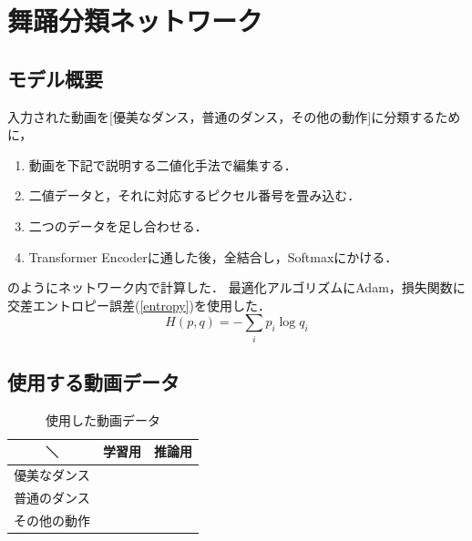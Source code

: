 \section{舞踊分類ネットワーク}

\subsection{モデル概要}
入力された動画を[優美なダンス，普通のダンス，その他の動作]に分類するために，
\begin{enumerate}
  \item 動画を下記で説明する二値化手法で編集する．
  \item 二値データと，それに対応するピクセル番号を畳み込む．
  \item 二つのデータを足し合わせる．
  \item Transformer Encoderに通した後，全結合し，Softmaxにかける．
\end{enumerate}
のようにネットワーク内で計算した．
最適化アルゴリズムにAdam\cite{adam}，損失関数に交差エントロピー誤差(\ref{entropy})を使用した．
\begin{equation}
  H(p, q) = -\sum_{i}p_i\log q_i
  \label{entropy}
\end{equation}

\subsection{使用する動画データ}
\begin{table}[b]
  \begin{center}
    \begin{tabular}{|c|c|c|} \hline
      ＼ & 学習用 & 推論用 \\ \hline
      優美なダンス
        & \cite{jpn}\cite{china}\cite{ballet}\cite{thai}\cite{jpn2}
        & \cite{balletgroup}\cite{jpngroup}\cite{chinagroup}\cite{belly}
      \\ \hline
      普通のダンス
        & \cite{ariana}\cite{kadokawa}\cite{bts}\cite{manolo}\cite{aito}
        & \cite{btsgroup}\cite{arashi}\cite{hyoga}\cite{legit}
      \\ \hline
      その他の動作
        & \cite{radio}\cite{posing}\cite{boxing}\cite{running}\cite{shinkokyu}\cite{leaves}
        & \cite{radio2}
      \\ \hline
    \end{tabular}
  \end{center}
  \caption{使用した動画データ}
  \label{video_data}
\end{table}

